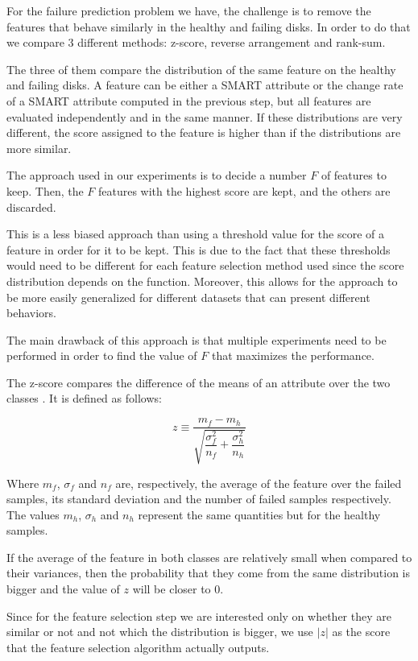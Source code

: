 For the failure prediction problem we have, the challenge is to remove the features that behave similarly in the healthy and failing disks.
In order to do that we compare 3 different methods: z-score, reverse arrangement and rank-sum.

The three of them compare the distribution of the same feature on the healthy and failing disks.
A feature can be either a SMART attribute or the change rate of a SMART attribute computed in the previous step, but all features are evaluated independently and in the same manner.
If these distributions are very different, the score assigned to the feature is higher than if the distributions are more similar.

The approach used in our experiments is to decide a number $F$ of features to keep.
Then, the $F$ features with the highest score are kept, and the others are discarded.

This is a less biased approach than using a threshold value for the score of a feature in order for it to be kept.
This is due to the fact that these thresholds would need to be different for each feature selection method used since the score distribution depends on the function.
Moreover, this allows for the approach to be more easily generalized for different datasets that can present different behaviors.

The main drawback of this approach is that multiple experiments need to be performed in order to find the value of $F$ that maximizes the performance.

The z-score compares the difference of the means of an attribute over the two classes \cite{Murray2005}.
It is defined as follows:

\begin{equation}
  z \equiv \dfrac{m_f - m_h}{\sqrt{\dfrac{\sigma_f^2}{n_f} + \dfrac{\sigma_h^2}{n_h}}}
\end{equation}

Where $m_f$, $\sigma_f$ and $n_f$ are, respectively, the average of the feature over the failed samples, its standard deviation and the number of failed samples respectively. 
The values $m_h$, $\sigma_h$ and $n_h$ represent the same quantities but for the healthy samples.

If the average of the feature in both classes are relatively small when compared to their variances, then the probability that they come from the same distribution is bigger and the value of $z$ will be closer to 0.

Since for the feature selection step we are interested only on whether they are similar or not and not which the distribution is bigger, we use $|z|$ as the score that the feature selection algorithm actually outputs.

